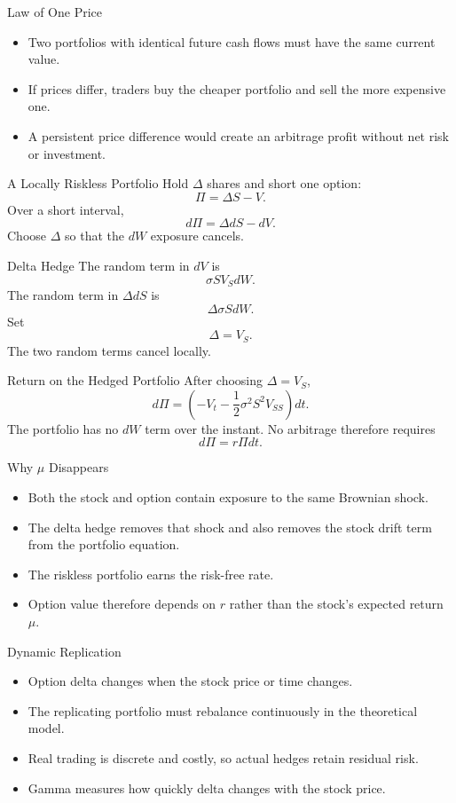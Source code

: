 \documentclass[aspectratio=169]{beamer}
\begin{document}
\begin{frame}[t]{Law of One Price}
\justifying
\begin{itemize}
\item Two portfolios with identical future cash flows must have the same current value.
\item If prices differ, traders buy the cheaper portfolio and sell the more expensive one.
\item A persistent price difference would create an arbitrage profit without net risk or investment.
\end{itemize}
\end{frame}

\begin{frame}[t]{A Locally Riskless Portfolio}
\justifying
Hold $\Delta$ shares and short one option:
\[\Pi=\Delta S-V.\]
Over a short interval,
\[d\Pi=\Delta dS-dV.\]
Choose $\Delta$ so that the $dW$ exposure cancels.
\end{frame}

\begin{frame}[t]{Delta Hedge}
\justifying
The random term in $dV$ is
\[\sigma SV_SdW.\]
The random term in $\Delta dS$ is
\[\Delta\sigma SdW.\]
Set
\[\Delta=V_S.\]
The two random terms cancel locally.
\end{frame}

\begin{frame}[t]{Return on the Hedged Portfolio}
\justifying
After choosing $\Delta=V_S$,
\[d\Pi=\left(-V_t-\frac12\sigma^2S^2V_{SS}\right)dt.\]
The portfolio has no $dW$ term over the instant. No arbitrage therefore requires
\[d\Pi=r\Pi dt.\]
\end{frame}

\begin{frame}[t]{Why $\mu$ Disappears}
\justifying
\begin{itemize}
\item Both the stock and option contain exposure to the same Brownian shock.
\item The delta hedge removes that shock and also removes the stock drift term from the portfolio equation.
\item The riskless portfolio earns the risk-free rate.
\item Option value therefore depends on $r$ rather than the stock’s expected return $\mu$.
\end{itemize}
\end{frame}

\begin{frame}[t]{Dynamic Replication}
\justifying
\begin{itemize}
\item Option delta changes when the stock price or time changes.
\item The replicating portfolio must rebalance continuously in the theoretical model.
\item Real trading is discrete and costly, so actual hedges retain residual risk.
\item Gamma measures how quickly delta changes with the stock price.
\end{itemize}
\end{frame}
\end{document}
